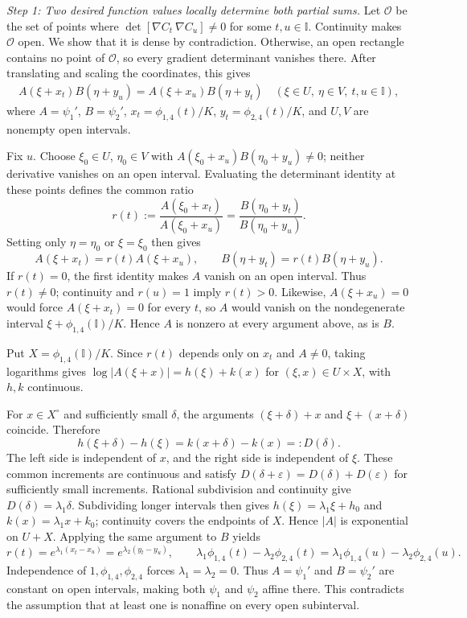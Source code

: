 \documentclass[journal,12pt,onecolumn,draftclsnofoot]{IEEEtran}
\begin{document}
\emph{Step 1: Two desired function values locally determine both partial sums.}
Let $\mathcal O$ be the set of points where
$\det[\nabla C_t\ \nabla C_u]\ne0$ for some $t,u\in\mathbb I$.
Continuity makes $\mathcal O$ open. We show that it is dense by
contradiction. Otherwise, an open rectangle contains no point of
$\mathcal O$, so every gradient determinant vanishes there.
After translating and scaling the coordinates, this gives
\begin{align*}
     A(\xi+x_t)B(\eta+y_u)=A(\xi+x_u)B(\eta+y_t)
 \quad(\xi\in U,\ \eta\in V,\ t,u\in\mathbb I),
\end{align*}
where $A=\psi_1'$, $B=\psi_2'$, $x_t=\phi_{1,4}(t)/K$,
$y_t=\phi_{2,4}(t)/K$, and $U,V$ are nonempty open intervals.

Fix $u$. Choose $\xi_0\in U$, $\eta_0\in V$ with
$A(\xi_0+x_u)B(\eta_0+y_u)\ne0$; neither derivative vanishes
on an open interval. Evaluating the determinant identity at these
points defines the common ratio
$$
r(t):=\frac{A(\xi_0+x_t)}{A(\xi_0+x_u)}
=\frac{B(\eta_0+y_t)}{B(\eta_0+y_u)}.
$$
Setting only $\eta=\eta_0$ or $\xi=\xi_0$ then gives
$$
 A(\xi+x_t)=r(t)A(\xi+x_u),\qquad
 B(\eta+y_t)=r(t)B(\eta+y_u).
$$
If $r(t)=0$, the first identity makes $A$ vanish on an open
interval. Thus $r(t)\ne0$; continuity and $r(u)=1$ imply $r(t)>0$.
Likewise, $A(\xi+x_u)=0$ would force
$A(\xi+x_t)=0$ for every $t$, so $A$ would vanish on the
nondegenerate interval $\xi+\phi_{1,4}(\mathbb I)/K$.
Hence $A$ is nonzero at every argument above, as is $B$.




Put $X=\phi_{1,4}(\mathbb I)/K$. Since $r(t)$ depends only on $x_t$
and $A\ne0$, taking logarithms gives
$\log|A(\xi+x)|=h(\xi)+k(x)$ for $(\xi,x)\in U\times X$,
with $h,k$ continuous.


For $x\in X^\circ$ and sufficiently small $\delta$, the arguments
$(\xi+\delta)+x$ and $\xi+(x+\delta)$ coincide. Therefore
$$
h(\xi+\delta)-h(\xi)=k(x+\delta)-k(x)=:D(\delta).
$$
The left side is independent of $x$, and the right side is independent
of $\xi$. These common increments are continuous and satisfy
$D(\delta+\varepsilon)=D(\delta)+D(\varepsilon)$ for sufficiently
small increments. Rational subdivision and continuity give
$D(\delta)=\lambda_1\delta$. Subdividing longer intervals then gives
$h(\xi)=\lambda_1\xi+h_0$ and $k(x)=\lambda_1x+k_0$;
continuity covers the endpoints of $X$. Hence $|A|$ is exponential
on $U+X$. Applying the same argument to $B$ yields
$$
r(t)=e^{\lambda_1(x_t-x_u)}=e^{\lambda_2(y_t-y_u)},
\qquad
\lambda_1\phi_{1,4}(t)-\lambda_2\phi_{2,4}(t)
=\lambda_1\phi_{1,4}(u)-\lambda_2\phi_{2,4}(u).
$$
Independence of $1,\phi_{1,4},\phi_{2,4}$ forces
$\lambda_1=\lambda_2=0$. Thus $A=\psi_1'$ and $B=\psi_2'$
are constant on open intervals, making both $\psi_1$ and $\psi_2$
affine there. This contradicts the assumption that at least one
is nonaffine on every open subinterval.
\end{document}
